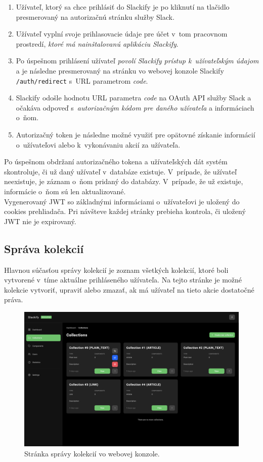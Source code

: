 \begin{enumerate}
	\item Užívateľ, ktorý sa chce prihlásiť do Slackify je po kliknutí na tlačidlo  presmerovaný na autorizačnú stránku služby Slack.
	\item Užívateľ vyplní svoje prihlasovacie údaje pre účet v~tom pracovnom prostredí, \emph{ktoré má nainštalovanú aplikáciu Slackify}.
	\item Po úspešnom prihlásení užívateľ \emph{povolí Slackify prístup k~užívateľským údajom} a je následne presmerovaný na stránku vo webovej konzole Slackify \texttt{/auth/redirect} s~URL parametrom \textit{code}.
	\item Slackify odošle hodnotu URL parametra \textit{code} na OAuth API služby Slack a očakáva odpoveď s~\emph{autorizačným kódom pre daného užívateľa} a informáciach o~ňom.
	\item Autorizačný token je následne možné využiť pre opätovné získanie informácií o~užívateľovi alebo k~vykonávaniu akcií za užívateľa.
\end{enumerate}

\noindent Po úspešnom obdržaní autorizačného tokena a užívateľských dát systém skontroluje, či už daný užívateľ v~databáze existuje. V~prípade, že užívateľ neexistuje, je záznam o~ňom pridaný do databázy. V~prípade, že už existuje, informácie o~ňom sú len aktualizované. \\

\noindent Vygenerovaný JWT so základnými informáciami o~užívateľovi je uložený do cookies prehliadača. Pri návšteve každej stránky prebieha kontrola, či uložený JWT nie je expirovaný.

\subsection{Správa kolekcií}
Hlavnou súčasťou správy kolekcií je zoznam všetkých kolekcií, ktoré boli vytvorené v~tíme aktuálne prihláseného užívateľa. Na tejto stránke je možné kolekcie vytvoriť, upraviť alebo zmazať, ak má užívateľ na tieto akcie dostatočné práva.

\begin{figure}[h]
	\centering
	\includegraphics[scale=0.085]{obrazky-figures/screenshot_collections}
	\caption{Stránka správy kolekcií vo webovej konzole.}
\end{figure}

